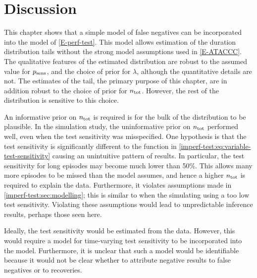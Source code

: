 \documentclass[thesis.tex]{subfiles}
\begin{document}
\section{Discussion} \label{imperf-test:sec:discussion}


This chapter shows that a simple model of false negatives can be incorporated into the model of \cref{E-perf-test}.
This model allows estimation of the duration distribution tails without the strong model assumptions used in \cref{E-ATACCC}.
The qualitative features of the estimated distribution are robust to the assumed value for $p_\text{sens}$, and the choice of prior for $\lambda$, although the quantitative details are not.
The estimates of the tail, the primary purpose of this chapter, are in addition robust to the choice of prior for $n_\text{tot}$.
However, the rest of the distribution is sensitive to this choice.

An informative prior on $n_\text{tot}$ is required is for the bulk of the distribution to be plausible.
In the simulation study, the uninformative prior on $n_\text{tot}$ performed well, even when the test sensitivity was misspecified.
One hypothesis is that the test sensitivity is significantly different to the function in \cref{imperf-test:eq:variable-test-sensitivity} causing an unintuitive pattern of results.
In particular, the test sensitivity for long episodes may become much lower than 50\%.
This allows many more episodes to be missed than the model assumes, and hence a higher $n_\text{tot}$ is required to explain the data.
Furthermore, it violates assumptions made in \cref{imperf-test:sec:modelling}; this is similar to when the simulating using a too low test sensitivity.
Violating these assumptions would lead to unpredictable inference results, perhaps those seen here.

Ideally, the test sensitivity would be estimated from the data.
However, this would require a model for time-varying test sensitivity to be incorporated into the model.
Furthermore, it is unclear that such a model would be identifiable because it would not be clear whether to attribute negative results to false negatives or to recoveries.
\end{document}
